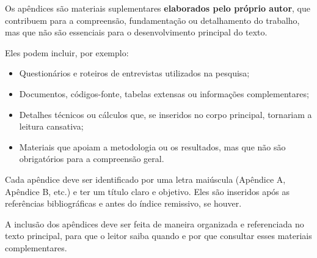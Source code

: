 
Os apêndices são materiais suplementares \textbf{elaborados pelo próprio autor}, que contribuem para a compreensão, fundamentação ou detalhamento do trabalho, mas que não são essenciais para o desenvolvimento principal do texto.

Eles podem incluir, por exemplo:

\begin{itemize}
    \item Questionários e roteiros de entrevistas utilizados na pesquisa;
    \item Documentos, códigos-fonte, tabelas extensas ou informações complementares;
    \item Detalhes técnicos ou cálculos que, se inseridos no corpo principal, tornariam a leitura cansativa;
    \item Materiais que apoiam a metodologia ou os resultados, mas que não são obrigatórios para a compreensão geral.
\end{itemize}

Cada apêndice deve ser identificado por uma letra maiúscula (Apêndice A, Apêndice B, etc.) e ter um título claro e objetivo. Eles são inseridos após as referências bibliográficas e antes do índice remissivo, se houver.

A inclusão dos apêndices deve ser feita de maneira organizada e referenciada no texto principal, para que o leitor saiba quando e por que consultar esses materiais complementares.